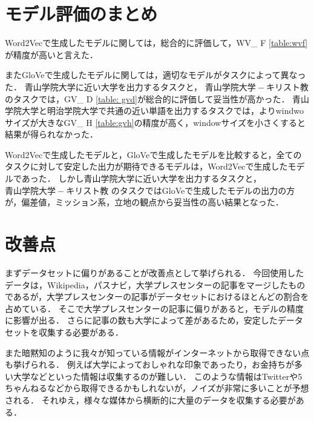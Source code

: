\section{モデル評価のまとめ}
Word2Vecで生成したモデルに関しては，総合的に評価して，WV\_ F \ref{table:wvf}が精度が高いと言えた．

またGloVeで生成したモデルに関しては，適切なモデルがタスクによって異なった．
青山学院大学に近い大学を出力するタスクと， $ 青山学院大学 - キリスト教 $ のタスクでは，GV\_ D \ref{table: gvd}が総合的に評価して妥当性が高かった．
青山学院大学と明治学院大学で共通の近い単語を出力するタスクでは，よりwindwoサイズが大きなGV\_ H \ref{table:gvh}の精度が高く，windowサイズを小さくすると結果が得られなかった．

Word2Vecで生成したモデルと，GloVeで生成したモデルを比較すると，全てのタスクに対して安定した出力が期待できるモデルは，Word2Vecで生成したモデルであった．
しかし青山学院大学に近い大学を出力するタスクと， $ 青山学院大学 - キリスト教 $ のタスクではGloVeで生成したモデルの出力の方が，偏差値，ミッション系，立地の観点から妥当性の高い結果となった．

\section{改善点}
まずデータセットに偏りがあることが改善点として挙げられる．
今回使用したデータは，Wikipedia，パスナビ，大学プレスセンターの記事をマージしたものであるが，大学プレスセンターの記事がデータセットにおけるほとんどの割合を占めている．
そこで大学プレスセンターの記事に偏りがあると，モデルの精度に影響が出る．
さらに記事の数も大学によって差があるため，安定したデータセットを収集する必要がある．

また暗黙知のように我々が知っている情報がインターネットから取得できない点も挙げられる．
例えば大学によっておしゃれな印象であったり，お金持ちが多い大学などといった情報は収集するのが難しい．
このような情報はTwitterや5ちゃんねるなどから取得できるかもしれないが，ノイズが非常に多いことが予想される．
それゆえ，様々な媒体から横断的に大量のデータを収集する必要がある．
